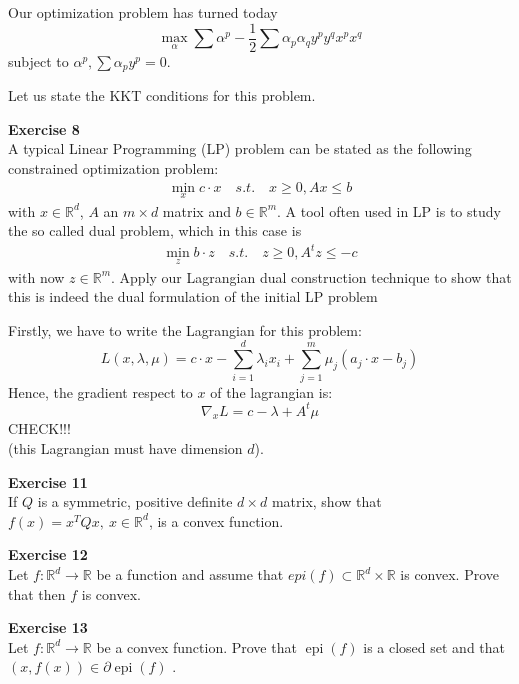 \documentclass[11pt,table]{article}
\newenvironment{problem}[2][Exercise]
    { \begin{mdframed}[backgroundcolor=gray!20] \textbf{#1 #2} \\}
    {  \end{mdframed}}
\newcommand\R{\mathbb R}
\begin{document}
Our optimization problem has turned today
\[
\max_{\alpha} \sum \alpha^p - \frac{1}{2}\sum \alpha_p \alpha_q y^p y^q x^p x^q  
\]
subject to \(\alpha^p, \sum \alpha_p y^p = 0\).

Let us state the KKT conditions for this problem.

\begin{problem}{8}
  A typical Linear Programming (LP) problem can be stated as the following constrained optimization problem:
  \begin{align*}
  \min_x c \cdot x \quad s.t. \quad x \geq 0, Ax \leq b
  \end{align*}
  with \(x \in \R^d\), \(A\) an \(m \times d\) matrix and \(b \in \R^m\). A tool often used in LP is to study the so called dual problem, which in this case is
  \begin{align*}
  \min_{z} b \cdot z \quad s.t. \quad z \geq 0, A^t z \leq -c
  \end{align*}
  with now \(z \in \R^m\). Apply our Lagrangian dual construction technique to show that this is indeed the dual formulation of the initial LP problem
\end{problem}

Firstly, we have to write the Lagrangian for this problem:
\[
L(x,\lambda,\mu) = c \cdot x -  \sum_{i=1}^d \lambda_i x_i  + \sum_{j=1}^m \mu_j(a_j \cdot x - b_j)  
\]
Hence, the gradient respect to \(x\) of the lagrangian is:
\[
\nabla_x L = c - \lambda + A^t \mu
\]
CHECK!!!\\
(this Lagrangian must have dimension \(d\)). 

\begin{problem}{11}
  If \( Q \) is a symmetric, positive definite \( d \times d \) matrix, show that \( f(x) = x^TQx, \ x \in \mathbb{R}^d \), is a convex function.
  \end{problem}

\begin{problem}{12}
  Let \( f:\mathbb{R}^d \to \mathbb{R} \)  be a function and assume that \( epi(f) \subset \mathbb{R}^d \times \mathbb{R} \)  is convex. Prove that then \( f \)  is convex.

\end{problem}



\begin{problem}{13}

  Let \( f : \mathbb{R}^d \to \mathbb{R} \) be a convex function. Prove that \( \operatorname{epi}(f) \) is a closed set and that \( (x, f(x)) \in \partial \operatorname{epi}(f) \)  .
\end{problem}
\end{document}
